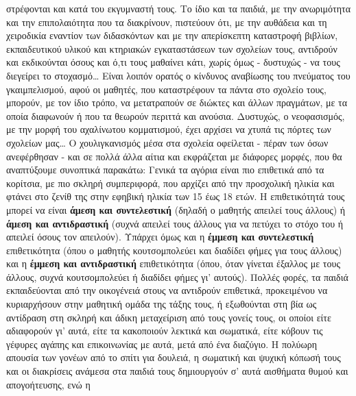 \documentclass[12pt,a4paper]{book}
\begin{document}
στρέφονται και κατά του εκγυμναστή τους. Το ίδιο και τα παιδιά,  με την
ανωριμότητα και την επιπολαιότητα που τα διακρίνουν, πιστεύουν ότι, με την
αυθάδεια και τη χειροδικία εναντίον των διδασκόντων και με την απερίσκεπτη
καταστροφή βιβλίων, εκπαιδευτικού υλικού και κτηριακών εγκαταστάσεων των
σχολείων τους, αντιδρούν και εκδικούνται όσους και ό,τι τους μαθαίνει κάτι,
χωρίς όμως - δυστυχώς - να τους διεγείρει το στοχασμό\ldots\vspace{6 mm} Είναι
λοιπόν ορατός ο κίνδυνος αναβίωσης του πνεύματος του γκαιμπελισμού, αφού οι μαθητές, που
καταστρέφουν τα πάντα στο σχολείο τους, μπορούν, με τον ίδιο τρόπο, να
μετατραπούν σε διώκτες και άλλων πραγμάτων,  με τα οποία διαφωνούν ή που τα
θεωρούν περιττά και ανούσια. Δυστυχώς, ο νεοφασισμός, με την μορφή του
αχαλίνωτου κομματισμού, έχει αρχίσει να χτυπά τις πόρτες των σχολείων
μας\ldots\vspace{6 mm}
\newline\setlength{\parindent}{20pt}\indent Ο χουλιγκανισμός μέσα στα σχολεία
οφείλεται - πέραν των όσων ανεφέρθησαν - και σε πολλά άλλα αίτια και εκφράζεται
με διάφορες μορφές, που θα αναπτύξουμε συνοπτικά παρακάτω: Γενικά τα αγόρια
είναι πιο επιθετικά από τα κορίτσια, με πιο σκληρή συμπεριφορά, που αρχίζει από
την προσχολική ηλικία και φτάνει στο ζενίθ της στην εφηβική ηλικία των 15 έως 18
ετών. Η επιθετικότητά τους μπορεί να είναι \textbf{άμεση και συντελεστική}
(δηλαδή ο μαθητής απειλεί τους άλλους) ή \textbf{άμεση και αντιδραστική} (συχνά
απειλεί τους άλλους για να πετύχει το στόχο του ή απειλεί όσους τον απειλούν).
Υπάρχει όμως και η \textbf{έμμεση και συντελεστική} επιθετικότητα (όπου ο
μαθητής κουτσομπολεύει και διαδίδει φήμες για τους άλλους) και η \textbf{έμμεση
και αντιδραστική} επιθετικότητα (όπου, όταν γίνεται έξαλλος με τους άλλους,
συχνά κουτσομπολεύει ή διαδίδει φήμες γι' αυτούς).
\newline\setlength{\parindent}{20pt}\indent Πολλές φορές, τα παιδιά
εκπαιδεύονται από την οικογένειά στους να αντιδρούν επιθετικά, προκειμένου να
κυριαρχήσουν στην μαθητική ομάδα της τάξης τους, ή εξωθούνται στη βία ως
αντίδραση στη σκληρή και άδικη μεταχείριση από τους γονείς τους, οι οποίοι είτε
αδιαφορούν γι' αυτά, είτε τα κακοποιούν λεκτικά και σωματικά, είτε κόβουν τις
γέφυρες αγάπης και επικοινωνίας με αυτά, μετά από ένα διαζύγιο.
\newline\setlength{\parindent}{20pt}\indent Η πολύωρη απουσία των γονέων από το
σπίτι για δουλειά, η σωματική και ψυχική κόπωσή τους και οι διακρίσεις ανάμεσα
στα παιδιά τους δημιουργούν σ' αυτά αισθήματα θυμού και απογοήτευσης, ενώ η
\end{document}
